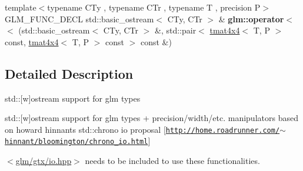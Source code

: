 \begin{DoxyCompactItemize}
\item 
\mbox{\label{group__gtx__io_ga67ab2a9a13c872bd33e6a0455c97ce9c}} 
{\footnotesize template$<$typename C\+Ty , typename C\+Tr , typename T , precision P$>$ }\\G\+L\+M\+\_\+\+F\+U\+N\+C\+\_\+\+D\+E\+CL std\+::basic\+\_\+ostream$<$ C\+Ty, C\+Tr $>$ \& {\bfseries glm\+::operator$<$$<$} (std\+::basic\+\_\+ostream$<$ C\+Ty, C\+Tr $>$ \&, std\+::pair$<$ \hyperlink{structglm_1_1tmat4x4}{tmat4x4}$<$ T, P $>$ const, \hyperlink{structglm_1_1tmat4x4}{tmat4x4}$<$ T, P $>$ const $>$ const \&)
\end{DoxyCompactItemize}


\subsection{Detailed Description}
std\+:\+:\mbox{[}w\mbox{]}ostream support for glm types 

std\+:\+:\mbox{[}w\mbox{]}ostream support for glm types + precision/width/etc. manipulators based on howard hinnant\textquotesingle{}s std\+::chrono io proposal \mbox{[}\href{http://home.roadrunner.com/~hinnant/bloomington/chrono_io.html}{\tt http\+://home.\+roadrunner.\+com/$\sim$hinnant/bloomington/chrono\+\_\+io.\+html}\mbox{]}

$<$\hyperlink{io_8hpp}{glm/gtx/io.\+hpp}$>$ needs to be included to use these functionalities. 